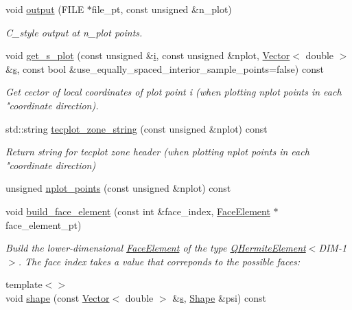 \begin{DoxyCompactItemize}
void \hyperlink{classoomph_1_1QHermiteElement_a12a4346480e45d82cbfca1f324cd4878}{output} (F\+I\+LE $\ast$file\+\_\+pt, const unsigned \&n\+\_\+plot)
\begin{DoxyCompactList}\small\item\em C\+\_\+style output at n\+\_\+plot points. \end{DoxyCompactList}\item 
void \hyperlink{classoomph_1_1QHermiteElement_a2b275f67da74572fb761d067bfaa71d1}{get\+\_\+s\+\_\+plot} (const unsigned \&\hyperlink{cfortran_8h_adb50e893b86b3e55e751a42eab3cba82}{i}, const unsigned \&nplot, \hyperlink{classoomph_1_1Vector}{Vector}$<$ double $>$ \&\hyperlink{cfortran_8h_ab7123126e4885ef647dd9c6e3807a21c}{s}, const bool \&use\+\_\+equally\+\_\+spaced\+\_\+interior\+\_\+sample\+\_\+points=false) const
\begin{DoxyCompactList}\small\item\em Get cector of local coordinates of plot point i (when plotting nplot points in each "coordinate direction). \end{DoxyCompactList}\item 
std\+::string \hyperlink{classoomph_1_1QHermiteElement_a29a26af721af282e5c03f93a0005ce5f}{tecplot\+\_\+zone\+\_\+string} (const unsigned \&nplot) const
\begin{DoxyCompactList}\small\item\em Return string for tecplot zone header (when plotting nplot points in each "coordinate direction) \end{DoxyCompactList}\item 
unsigned \hyperlink{classoomph_1_1QHermiteElement_a4afca94e16e9a63c4e2a0fa4ee2853db}{nplot\+\_\+points} (const unsigned \&nplot) const
\item 
void \hyperlink{classoomph_1_1QHermiteElement_a796c8d180b039c5e753b373ba7aa720a}{build\+\_\+face\+\_\+element} (const int \&face\+\_\+index, \hyperlink{classoomph_1_1FaceElement}{Face\+Element} $\ast$face\+\_\+element\+\_\+pt)
\begin{DoxyCompactList}\small\item\em Build the lower-\/dimensional \hyperlink{classoomph_1_1FaceElement}{Face\+Element} of the type \hyperlink{classoomph_1_1QHermiteElement}{Q\+Hermite\+Element}$<$D\+I\+M-\/1$>$. The face index takes a value that correponds to the possible faces\+: \end{DoxyCompactList}\item 
{\footnotesize template$<$$>$ }\\void \hyperlink{classoomph_1_1QHermiteElement_a8c5693519e823d93b38c120e47e82330}{shape} (const \hyperlink{classoomph_1_1Vector}{Vector}$<$ double $>$ \&\hyperlink{cfortran_8h_ab7123126e4885ef647dd9c6e3807a21c}{s}, \hyperlink{classoomph_1_1Shape}{Shape} \&psi) const

\end{DoxyCompactItemize}
